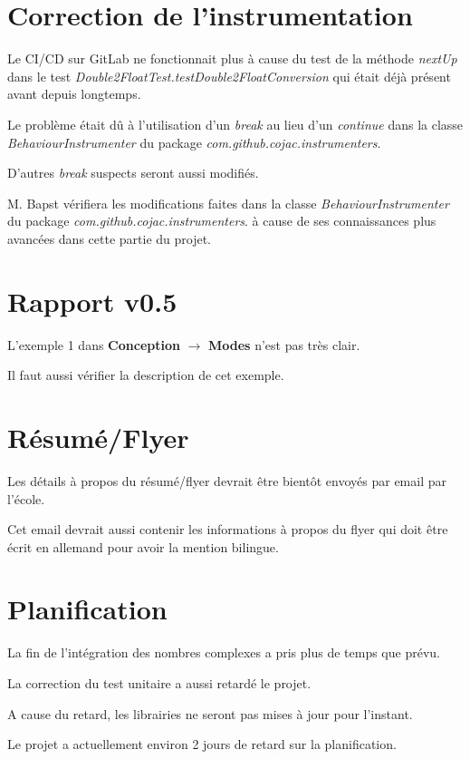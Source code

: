 \documentclass[11pt]{meetingmins}
\begin{document}
\section{Correction de l'instrumentation}
\begin{hiddenitems}
    \item Le CI/CD sur GitLab ne fonctionnait plus à cause du test de la méthode \textit{nextUp} dans le test \textit{Double2FloatTest.testDouble2FloatConversion} qui était déjà présent avant depuis longtemps.
    \item Le problème était dû à l'utilisation d'un \textit{break} au lieu d'un \textit{continue} dans la classe \textit{BehaviourInstrumenter} du package \textit{com.github.cojac.instrumenters}.
    \item D'autres \textit{break} suspects seront aussi modifiés.
    \item M. Bapst vérifiera les modifications faites dans la classe \textit{BehaviourInstrumenter} du package \textit{com.github.cojac.instrumenters}. à cause de ses connaissances plus avancées dans cette partie du projet.
\end{hiddenitems}

\section{Rapport v0.5}
\begin{hiddenitems}
    \item L'exemple 1 dans \textbf{Conception} $\rightarrow$ \textbf{Modes} n'est pas très clair.
    \item Il faut aussi vérifier la description de cet exemple.
\end{hiddenitems}

\section{Résumé/Flyer}
\begin{hiddenitems}
    \item Les détails à propos du résumé/flyer devrait être bientôt envoyés par email par l'école.
    \item Cet email devrait aussi contenir les informations à propos du flyer qui doit être écrit en allemand pour avoir la mention bilingue.
\end{hiddenitems}

\section{Planification}
\begin{hiddenitems}
    \item La fin de l'intégration des nombres complexes a pris plus de temps que prévu.
    \item La correction du test unitaire a aussi retardé le projet.
    \item A cause du retard, les librairies ne seront pas mises à jour pour l'instant.
    \item Le projet a actuellement environ 2 jours de retard sur la planification.
\end{hiddenitems}
\end{document}
